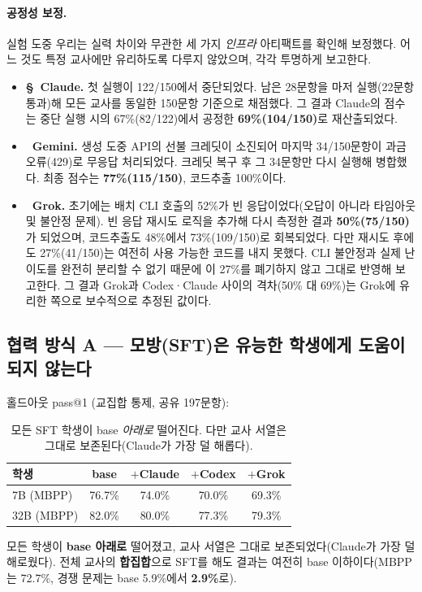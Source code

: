 \documentclass[11pt]{article}
\begin{document}
\paragraph{공정성 보정.}
실험 도중 우리는 실력 차이와 무관한 세 가지 \emph{인프라} 아티팩트를 확인해 보정했다. 어느 것도 특정 교사에만 유리하도록 다루지 않았으며, 각각 투명하게 보고한다.
\begin{itemize}
  \item \textbf{\S\ Claude.} 첫 실행이 122/150에서 중단되었다. 남은 28문항을 마저 실행(22문항 통과)해 모든 교사를 동일한 150문항 기준으로 채점했다. 그 결과 Claude의 점수는 중단 실행 시의 67\%(82/122)에서 공정한 \textbf{69\%(104/150)}로 재산출되었다.
  \item \textbf{\ddag\ Gemini.} 생성 도중 API의 선불 크레딧이 소진되어 마지막 34/150문항이 과금 오류(429)로 무응답 처리되었다. 크레딧 복구 후 그 34문항만 다시 실행해 병합했다. 최종 점수는 \textbf{77\%(115/150)}, 코드추출 100\%이다.
  \item \textbf{\dag\ Grok.} 초기에는 배치 CLI 호출의 52\%가 빈 응답이었다(오답이 아니라 타임아웃 및 불안정 문제). 빈 응답 재시도 로직을 추가해 다시 측정한 결과 \textbf{50\%(75/150)}가 되었으며, 코드추출도 48\%에서 73\%(109/150)로 회복되었다. 다만 재시도 후에도 27\%(41/150)는 여전히 사용 가능한 코드를 내지 못했다. CLI 불안정과 실제 난이도를 완전히 분리할 수 없기 때문에 이 27\%를 폐기하지 않고 그대로 반영해 보고한다. 그 결과 Grok과 Codex·Claude 사이의 격차(50\% 대 69\%)는 Grok에 유리한 쪽으로 보수적으로 추정된 값이다.
\end{itemize}

\subsection{협력 방식 A --- 모방(SFT)은 유능한 학생에게 도움이 되지 않는다}
홀드아웃 pass@1 (교집합 통제, 공유 197문항):
\begin{table}[h]\centering
\begin{tabular}{lcccc}
\toprule
학생 & base & $+$Claude & $+$Codex & $+$Grok \\
\midrule
7B (MBPP)  & 76.7\% & 74.0\% & 70.0\% & 69.3\% \\
32B (MBPP) & 82.0\% & 80.0\% & 77.3\% & 79.3\% \\
\bottomrule
\end{tabular}
\caption{모든 SFT 학생이 base \emph{아래로} 떨어진다. 다만 교사 서열은 그대로 보존된다(Claude가 가장 덜 해롭다).}
\end{table}

모든 학생이 \textbf{base 아래로} 떨어졌고, 교사 서열은 그대로 보존되었다(Claude가 가장 덜 해로웠다). 전체 교사의 \textbf{합집합}으로 SFT를 해도 결과는 여전히 base 이하이다(MBPP는 72.7\%, 경쟁 문제는 base 5.9\%에서 \textbf{2.9\%}로).
\end{document}
